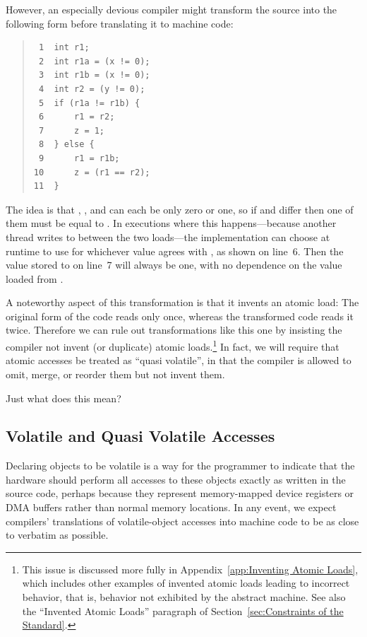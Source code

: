 \documentclass[10]{article}
\begin{document}
However, an especially devious compiler might transform the source into
the following form before translating it to machine code:
\begin{quote}
\begin{verbatim}
 1  int r1;
 2  int r1a = (x != 0);
 3  int r1b = (x != 0);
 4  int r2 = (y != 0);
 5  if (r1a != r1b) {
 6      r1 = r2;
 7      z = 1;
 8  } else {
 9      r1 = r1b;
10      z = (r1 == r2);
11  }
\end{verbatim}
\end{quote}
The idea is that , , and  can each be only zero or one,
so if  and  differ then one of them must be equal to .
In executions where this happens---because another thread writes to 
between the two loads---the implementation can choose at runtime to use
for  whichever value agrees with , as shown on line~6.
Then the value stored to  on line~7 will always be one,
with no dependence on the value loaded from .

A noteworthy aspect of this transformation is that it invents an atomic load:
The original form of the code reads  only once,
whereas the transformed code reads it twice.
Therefore we can rule out transformations like this one by insisting
the compiler not invent (or duplicate) atomic loads.\footnote{
	This issue is discussed more fully in
	Appendix~\ref{app:Inventing Atomic Loads},
	which includes other examples of invented atomic
	loads leading to incorrect behavior, that is, behavior not
	exhibited by the abstract machine.
	See also the ``Invented Atomic Loads'' paragraph of
        Section~\ref{sec:Constraints of the Standard}.}
In fact, we will require that atomic accesses be treated as
``quasi volatile'', in that the compiler is allowed to omit,
merge, or reorder them but not invent them.

Just what does this mean?

\subsection{Volatile and Quasi Volatile Accesses}
\label{sec:Volatile and Quasi Volatile Accesses}

Declaring objects to be volatile is a way for the programmer to
indicate that the hardware should perform all accesses to these
objects exactly as written in the source code, perhaps because they
represent memory-mapped device registers or DMA buffers rather than
normal memory locations.
In any event, we expect compilers' translations of volatile-object accesses
into machine code to be as close to verbatim as possible.
\end{document}
